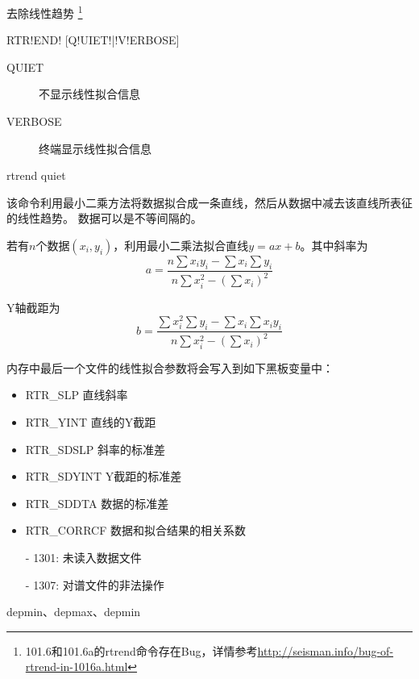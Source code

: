 \label{cmd:rtrend}

去除线性趋势
\footnote{101.6和101.6a的rtrend命令存在Bug，详情参考\url{http://seisman.info/bug-of-rtrend-in-1016a.html}}

\begin{SACSTX}
RTR!END! [Q!UIET!|!V!ERBOSE]
\end{SACSTX}

\begin{description}
\item [QUIET] 不显示线性拟合信息
\item [VERBOSE] 终端显示线性拟合信息
\end{description}

\begin{SACDFT}
rtrend quiet
\end{SACDFT}

该命令利用最小二乘方法将数据拟合成一条直线，然后从数据中减去该直线所表征的线性趋势。
数据可以是不等间隔的。

若有$n$个数据$(x_i,y_i)$，利用最小二乘法拟合直线$y=ax+b$。其中斜率为
\[
    a = \frac{n\sum x_i y_i - \sum x_i \sum y_i}
    {n\sum x_i^2 - (\sum x_i)^2}
\]

Y轴截距为
\[
    b = \frac{\sum x_i^2 \sum y_i - \sum x_i \sum x_i y_i}
    {n\sum x_i^2 - (\sum x_i)^2}
\]

内存中最后一个文件的线性拟合参数将会写入到如下黑板变量中：
\begin{itemize}
\item RTR\_SLP 直线斜率
\item RTR\_YINT 直线的Y截距
\item RTR\_SDSLP 斜率的标准差
\item RTR\_SDYINT Y截距的标准差
\item RTR\_SDDTA 数据的标准差
\item RTR\_CORRCF 数据和拟合结果的相关系数
\end{itemize}

\begin{itemize}
\item[-]1301: 未读入数据文件
\item[-]1307: 对谱文件的非法操作
\end{itemize}

depmin、depmax、depmin

